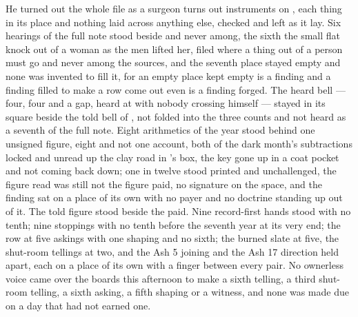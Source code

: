 He turned out the whole file as a surgeon turns out instruments on , each thing in its place and nothing laid across anything else, checked and left as it lay. Six hearings of the full note stood beside and never among, the sixth the small flat knock out of a woman as the men lifted her, filed where a thing out of a person must go and never among the sources, and the seventh place stayed empty and none was invented to fill it, for an empty place kept empty is a finding and a finding filled to make a row come out even is a finding forged. The heard bell --- four, four and a gap, heard at  with nobody crossing himself --- stayed in its square beside the told bell of , not folded into the three counts and not heard as a seventh of the full note. Eight arithmetics of the year stood behind one unsigned figure, eight and not one account, both of the dark month’s subtractions locked and unread up the clay road in ’s box, the key gone up in a coat pocket and not coming back down; one in twelve stood printed and unchallenged, the figure read was still not the figure paid, no signature on the space, and the finding sat on a place of its own with no payer and no doctrine standing up out of it. The told figure stood beside the paid. Nine record-first hands stood with no tenth; nine stoppings with no tenth before the seventh year at its very end; the row at five askings with one shaping and no sixth; the burned slate at five, the shut-room tellings at two, and the Ash 5 joining and the Ash 17 direction held apart, each on a place of its own with a finger between every pair. No ownerless voice came over the boards this afternoon to make a sixth telling, a third shut-room telling, a sixth asking, a fifth shaping or a witness, and none was made due on a day that had not earned one.

\scenebreak

